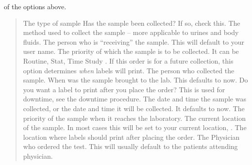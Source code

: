 

 of the options above.

\begin{quote}
\begin{description}
     The type of sample 
     Has the sample been collected? If so, check this.
     The method used to collect the sample -- more applicable to urines and body fluids.
     The person who is ``receiving'' the sample. This will default to your user name.
     The priority of which the sample is to be collected. It can be Routine, Stat, Time Study \etc. If this order is for a future collection, this option determines \textit{when} labels will print.
     The person who collected the sample.
     When was the sample brought to the lab. This defaults to now.
     Do you want a label to print after you place the order?
     This is used for downtime, see the downtime procedure.
     The date and time the sample was collected, or the date and time it will be collected. It defaults to now.
     The priority of the sample when it reaches the laboratory.
     The current location of the sample. In most cases this will be set to your current location, .
     The location where labels should print after placing the order.
     The Physician who ordered the test. This will usually default to the patients attending physician.
\end{description}
\end{quote}


